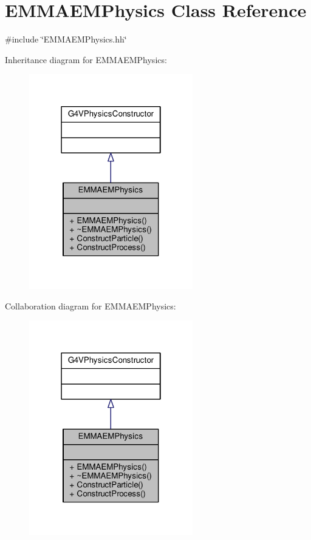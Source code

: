 \hypertarget{classEMMAEMPhysics}{}\section{E\+M\+M\+A\+E\+M\+Physics Class Reference}
\label{classEMMAEMPhysics}


{\ttfamily \#include \char`\"{}E\+M\+M\+A\+E\+M\+Physics.\+hh\char`\"{}}



Inheritance diagram for E\+M\+M\+A\+E\+M\+Physics\+:
\nopagebreak
\begin{figure}[H]
\begin{center}
\leavevmode
\includegraphics[width=202pt]{classEMMAEMPhysics__inherit__graph}
\end{center}
\end{figure}


Collaboration diagram for E\+M\+M\+A\+E\+M\+Physics\+:
\nopagebreak
\begin{figure}[H]
\begin{center}
\leavevmode
\includegraphics[width=202pt]{classEMMAEMPhysics__coll__graph}
\end{center}
\end{figure}
